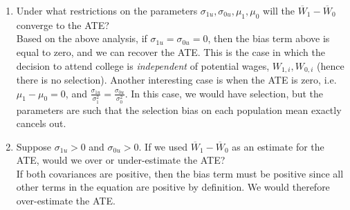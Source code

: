 \documentclass[12pt]{article}
\newcommand\ov{\overline}
\numberwithin{equation}{section}
\numberwithin{figure}{section}
\numberwithin{table}{section}
\begin{document}
\begin{enumerate}
\item Under what restrictions on the parameters $\sigma_{1u},\sigma_{0u},\mu_1,\mu_0$ will the $\ov{W}_1-\ov{W}_0$ converge to the ATE? \\
  {\color{blue}  Based on the above analysis, if $\sigma_{1u}=\sigma_{0u}=0$, then the bias term above is equal to zero, and we can recover the ATE. This is the case in which the decision to attend college is \emph{independent} of potential wages, $W_{1,i},W_{0,i}$ (hence there is no selection). Another interesting case is when the ATE is zero, i.e. $\mu_1-\mu_0=0$, and $\frac{\sigma_{1u}}{\sigma^2_1}=\frac{\sigma_{0u}}{\sigma^2_0}$. In this case, we would have selection, but the parameters are such that the selection bias on each population mean exactly cancels out. 
    }
  \item Suppose $\sigma_{1u}>0$ and $\sigma_{0u}>0$. If we used $\ov{W}_1-\ov{W}_0$ as an estimate for the ATE, would we over or under-estimate the ATE? \\
    {\color{blue} If both covariances are positive, then the bias term must be positive since all other terms in the equation are positive by definition. We would therefore over-estimate the ATE.}
\end{enumerate}
\end{document}
